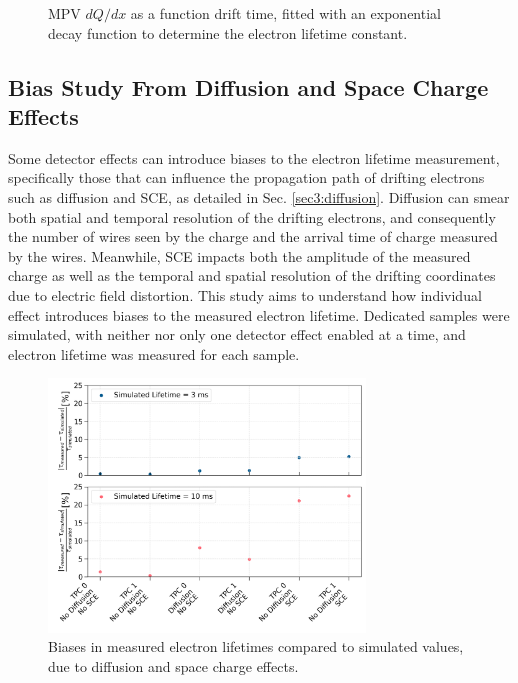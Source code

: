 \begin{figure}[bp!]
\begin{subfigure}[b]{0.495\textwidth}
        \end{subfigure}
        \caption[etime_tpc]{MPV $dQ/dx$ as a function drift time, fitted with an exponential decay function to determine the electron lifetime constant.}
        \label{fig:etime_tpc}
\end{figure}

\subsection{Bias Study From Diffusion and Space Charge Effects}
\label{sec7:etime_bias}

Some detector effects can introduce biases to the electron lifetime measurement, specifically those that can influence the propagation path of drifting electrons such as diffusion and SCE, as detailed
 in Sec. \ref{sec3:diffusion}.
Diffusion can smear both spatial and temporal resolution of the drifting electrons, and consequently the number of wires seen by the charge and the arrival time of charge measured by the wires.
Meanwhile, SCE impacts both the amplitude of the measured charge as well as the temporal and spatial resolution of the drifting coordinates due to electric field distortion.
This study aims to understand how individual effect introduces biases to the measured electron lifetime.
Dedicated samples were simulated, with neither nor only one detector effect enabled at a time, and electron lifetime was measured for each sample.

\begin{figure}[bp!] 
\centering    
\includegraphics[width=0.75\textwidth]{etime_biases_compare}
\caption[etime_biases_compare]{
Biases in measured electron lifetimes compared to simulated values, due to diffusion and space charge effects.
}
\label{fig:etime_biases_compare}
\end{figure}

